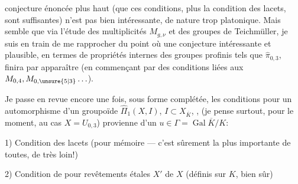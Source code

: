 conjecture énoncée plus haut (que ces conditions, plus la condition des lacets,  sont suffisantes) n'est pas bien intéressante, de nature trop platonique. Mais    semble que via l'étude des multiplicités  $M_{g,\nu}$ et des groupes de Teichmüller, je suis en train de me rapprocher du point où une conjecture intéressante et plausible, en termes de propriétés internes des groupes profinis tels que $\widehat{\pi}_{0,3}$, finira par apparaître (en commençant par des conditions liées aux $M_{0,4},M_{0,\unsure{5|3}}\ldots$).

Je passe en revue encore une fois, sous forme complétée, les conditions pour un automorphisme \inserted{$\Theta$} d'un groupoïde $\widehat{\Pi}_1(X,I)$, $I\subset X_{\overline{K}}$, , (je pense surtout, pour le moment, au cas $X=U_{0,3}$) provienne d'un $u\in\Gamma=\operatorname{Gal}\overline{K}/K$:

1) Condition des lacets (pour mémoire --- c'est sûrement la plus importante de toutes, de très loin!)

2) Condition de  pour revêtements étales  $X'$ de $X$ (définis sur $K$, bien sûr)
